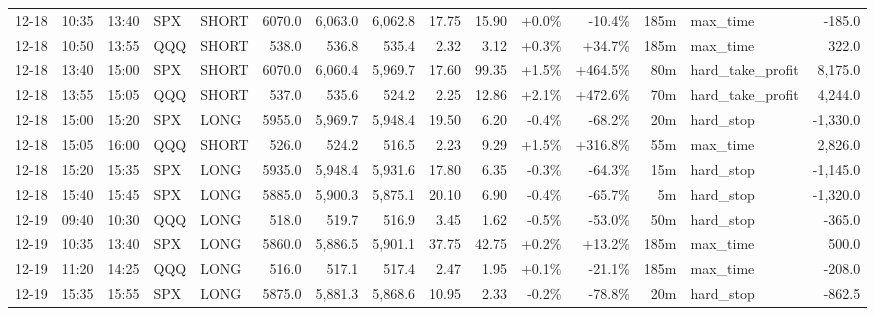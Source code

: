 \documentclass[11pt,a4paper,twoside]{article}
\begin{document}
\begin{landscape}
\begin{center}
\begin{longtable}{>{\color{txtmain}}l l l l l r r r r r r r r >{\color{txtmain}}l r}
12-18 & 10:35 & 13:40 & SPX & SHORT & 6070.0 & 6,063.0 & 6,062.8 & 17.75 & 15.90 & \textcolor{wingreen}{+0.0\%} & \textcolor{lossred}{-10.4\%} & 185m & max\_time & \textcolor{lossred}{-185.0} \\
12-18 & 10:50 & 13:55 & QQQ & SHORT & 538.0 & 536.8 & 535.4 & 2.32 & 3.12 & \textcolor{wingreen}{+0.3\%} & \textcolor{wingreen}{+34.7\%} & 185m & max\_time & \textcolor{wingreen}{322.0} \\
12-18 & 13:40 & 15:00 & SPX & SHORT & 6070.0 & 6,060.4 & 5,969.7 & 17.60 & 99.35 & \textcolor{wingreen}{+1.5\%} & \textcolor{wingreen}{+464.5\%} & 80m & hard\_take\_profit & \textcolor{wingreen}{8,175.0} \\
12-18 & 13:55 & 15:05 & QQQ & SHORT & 537.0 & 535.6 & 524.2 & 2.25 & 12.86 & \textcolor{wingreen}{+2.1\%} & \textcolor{wingreen}{+472.6\%} & 70m & hard\_take\_profit & \textcolor{wingreen}{4,244.0} \\
12-18 & 15:00 & 15:20 & SPX & LONG & 5955.0 & 5,969.7 & 5,948.4 & 19.50 & 6.20 & \textcolor{lossred}{-0.4\%} & \textcolor{lossred}{-68.2\%} & 20m & hard\_stop & \textcolor{lossred}{-1,330.0} \\
12-18 & 15:05 & 16:00 & QQQ & SHORT & 526.0 & 524.2 & 516.5 & 2.23 & 9.29 & \textcolor{wingreen}{+1.5\%} & \textcolor{wingreen}{+316.8\%} & 55m & max\_time & \textcolor{wingreen}{2,826.0} \\
12-18 & 15:20 & 15:35 & SPX & LONG & 5935.0 & 5,948.4 & 5,931.6 & 17.80 & 6.35 & \textcolor{lossred}{-0.3\%} & \textcolor{lossred}{-64.3\%} & 15m & hard\_stop & \textcolor{lossred}{-1,145.0} \\
12-18 & 15:40 & 15:45 & SPX & LONG & 5885.0 & 5,900.3 & 5,875.1 & 20.10 & 6.90 & \textcolor{lossred}{-0.4\%} & \textcolor{lossred}{-65.7\%} & 5m & hard\_stop & \textcolor{lossred}{-1,320.0} \\
12-19 & 09:40 & 10:30 & QQQ & LONG & 518.0 & 519.7 & 516.9 & 3.45 & 1.62 & \textcolor{lossred}{-0.5\%} & \textcolor{lossred}{-53.0\%} & 50m & hard\_stop & \textcolor{lossred}{-365.0} \\
12-19 & 10:35 & 13:40 & SPX & LONG & 5860.0 & 5,886.5 & 5,901.1 & 37.75 & 42.75 & \textcolor{wingreen}{+0.2\%} & \textcolor{wingreen}{+13.2\%} & 185m & max\_time & \textcolor{wingreen}{500.0} \\
12-19 & 11:20 & 14:25 & QQQ & LONG & 516.0 & 517.1 & 517.4 & 2.47 & 1.95 & \textcolor{wingreen}{+0.1\%} & \textcolor{lossred}{-21.1\%} & 185m & max\_time & \textcolor{lossred}{-208.0} \\
12-19 & 15:35 & 15:55 & SPX & LONG & 5875.0 & 5,881.3 & 5,868.6 & 10.95 & 2.33 & \textcolor{lossred}{-0.2\%} & \textcolor{lossred}{-78.8\%} & 20m & hard\_stop & \textcolor{lossred}{-862.5} \\

\end{longtable}
\end{center}
\end{landscape}
\end{document}
